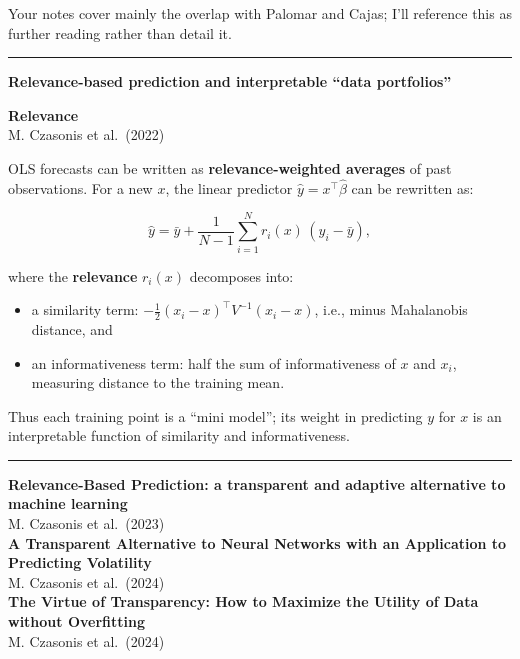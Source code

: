 \documentclass[a5paper]{article}
\providecommand{\tightlist}{%
  \setlength{\itemsep}{0pt}\setlength{\parskip}{0pt}}
\def\subsection#1{{\par\bigskip\goodbreak\large\bfseries #1\par}}
\begin{document}
Your notes cover mainly the overlap with Palomar and Cajas; I'll
reference this as further reading rather than detail it.

\begin{center}\rule{0.5\linewidth}{0.5pt}\end{center}

\subsection{Relevance-based prediction and interpretable ``data
portfolios''}\label{relevance-based-prediction-and-interpretable-data-portfolios}

\textbf{Relevance}\\
M. Czasonis et al.~(2022)

OLS forecasts can be written as \textbf{relevance-weighted averages} of
past observations. For a new $x$, the linear predictor $\hat y =
x^\top \hat\beta$ can be rewritten as:

\[ \hat y = \bar y + \frac{1}{N-1}\sum_{i=1}^N r_i(x)\,(y_i-\bar y), \]

where the \textbf{relevance} $r_i(x)$ decomposes into:

\begin{itemize}
\tightlist
\item
  a similarity term:
  $-\tfrac12(x_i-x)^\top V^{-1}(x_i-x)$, i.e., minus
  Mahalanobis distance, and
\item
  an informativeness term: half the sum of informativeness of $x$ and
  $x_i$, measuring distance to the training mean.
\end{itemize}

Thus each training point is a ``mini model''; its weight in predicting $y$
for $x$ is an interpretable function of similarity and informativeness.

\begin{center}\rule{0.5\linewidth}{0.5pt}\end{center}

\textbf{Relevance-Based Prediction: a transparent and adaptive
alternative to machine learning}\\
M. Czasonis et al.~(2023)\\
\textbf{A Transparent Alternative to Neural Networks with an Application
to Predicting Volatility}\\
M. Czasonis et al.~(2024)\\
\textbf{The Virtue of Transparency: How to Maximize the Utility of Data
without Overfitting}\\
M. Czasonis et al.~(2024)
\end{document}
